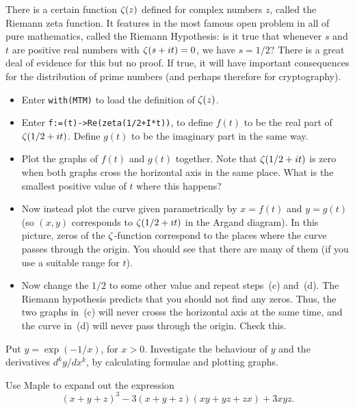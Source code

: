 \documentclass[a4paper,10pt]{amsbook}
\begin{document}
\begin{exercise}
 There is a certain function $\zeta(z)$ defined for complex numbers $z$,
 called the Riemann zeta function.  It features in the most famous
 open problem in all of pure mathematics, called the Riemann
 Hypothesis: is it true that whenever $s$ and $t$ are positive real
 numbers with $\zeta(s+it)=0$, we have $s=1/2$?  There is a great deal
 of evidence for this but no proof.  If true, it will have important
 consequences for the distribution of prime numbers (and perhaps
 therefore for cryptography).

 \begin{itemize}
  \item[(a)] Enter \verb~with(MTM)~ to load the definition of
   $\zeta(z)$.
  \item[(b)] Enter \verb~f:=(t)->Re(zeta(1/2+I*t))~, to
   define $f(t)$ to be the real part of $\zeta(1/2+it)$.  Define $g(t)$ to
   be the imaginary part in the same way.
  \item[(c)] Plot the graphs of $f(t)$ and $g(t)$ together.  Note that
   $\zeta(1/2+it)$ is zero when both graphs cross the horizontal axis in
   the same place.  What is the smallest positive value of $t$ where
   this happens?
  \item[(d)] Now instead plot the curve given parametrically by
   $x=f(t)$ and $y=g(t)$ (so $(x,y)$ corresponds to $\zeta(1/2+it)$ in
   the Argand diagram).  In this picture, zeros of the $\zeta$-function
   correspond to the places where the curve passes through the
   origin.  You should see that there are many of them (if you use a
   suitable range for $t$).
  \item[(e)] Now change the $1/2$ to some other value and repeat
   steps~(c) and~(d).  The Riemann hypothesis predicts that you should
   not find any zeros.  Thus, the two graphs in~(c) will never crosss
   the horizontal axis at the same time, and the curve in~(d) will
   never pass through the origin.  Check this.
 \end{itemize}
\end{exercise}

\begin{exercise}
 Put $y=\exp(-1/x)$, for $x>0$.  Investigate the behaviour of $y$ and
 the derivatives $d^ky/dx^k$, by calculating formulae and plotting
 graphs.  
\end{exercise}

\begin{exercise}\label{ex-expand-symmetric}
 Use Maple to expand out the expression
 \[ (x+y+z)^3 - 3(x+y+z)(xy+yz+zx) + 3xyz. \]
\end{exercise}
\end{document}
